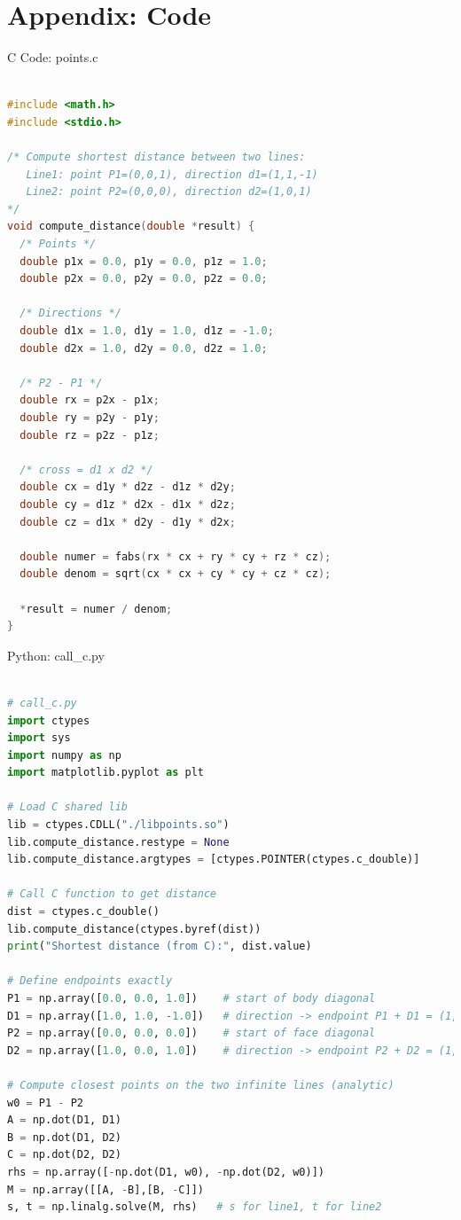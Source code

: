 \documentclass{beamer}
\numberwithin{equation}{section}
\theoremstyle{remark}
\begin{document}
\section*{Appendix: Code}

\begin{frame}[fragile]{C Code: points.c}
\begin{lstlisting}[language=C]

#include <math.h>
#include <stdio.h>

/* Compute shortest distance between two lines:
   Line1: point P1=(0,0,1), direction d1=(1,1,-1)
   Line2: point P2=(0,0,0), direction d2=(1,0,1)
*/
void compute_distance(double *result) {
  /* Points */
  double p1x = 0.0, p1y = 0.0, p1z = 1.0;
  double p2x = 0.0, p2y = 0.0, p2z = 0.0;

  /* Directions */
  double d1x = 1.0, d1y = 1.0, d1z = -1.0;
  double d2x = 1.0, d2y = 0.0, d2z = 1.0;

  /* P2 - P1 */
  double rx = p2x - p1x;
  double ry = p2y - p1y;
  double rz = p2z - p1z;

  /* cross = d1 x d2 */
  double cx = d1y * d2z - d1z * d2y;
  double cy = d1z * d2x - d1x * d2z;
  double cz = d1x * d2y - d1y * d2x;

  double numer = fabs(rx * cx + ry * cy + rz * cz);
  double denom = sqrt(cx * cx + cy * cy + cz * cz);

  *result = numer / denom;
}

\end{lstlisting}
\end{frame}

\begin{frame}[fragile]{Python: call\_c.py}
\begin{lstlisting}[language=Python]

# call_c.py
import ctypes
import sys
import numpy as np
import matplotlib.pyplot as plt

# Load C shared lib
lib = ctypes.CDLL("./libpoints.so")
lib.compute_distance.restype = None
lib.compute_distance.argtypes = [ctypes.POINTER(ctypes.c_double)]

# Call C function to get distance
dist = ctypes.c_double()
lib.compute_distance(ctypes.byref(dist))
print("Shortest distance (from C):", dist.value)

# Define endpoints exactly
P1 = np.array([0.0, 0.0, 1.0])    # start of body diagonal
D1 = np.array([1.0, 1.0, -1.0])   # direction -> endpoint P1 + D1 = (1,1,0)
P2 = np.array([0.0, 0.0, 0.0])    # start of face diagonal
D2 = np.array([1.0, 0.0, 1.0])    # direction -> endpoint P2 + D2 = (1,0,1)

# Compute closest points on the two infinite lines (analytic)
w0 = P1 - P2
A = np.dot(D1, D1)
B = np.dot(D1, D2)
C = np.dot(D2, D2)
rhs = np.array([-np.dot(D1, w0), -np.dot(D2, w0)])
M = np.array([[A, -B],[B, -C]])
s, t = np.linalg.solve(M, rhs)   # s for line1, t for line2

\end{lstlisting}
\end{frame}
\end{document}
